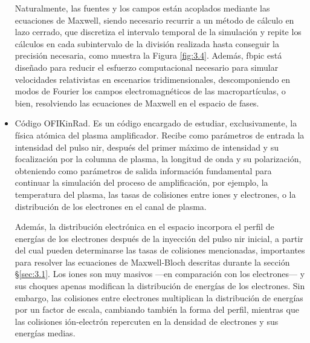 \begin{itemize}
      Naturalmente, las fuentes y los campos están acoplados mediante las ecuaciones de Maxwell, siendo necesario recurrir a un método de cálculo en lazo cerrado, que discretiza el intervalo temporal de la simulación y repite los cálculos en cada subintervalo de la división realizada hasta conseguir la precisión necesaria, como muestra la Figura \ref{fig:3.4}. Además, \acrshort{fbpic} está diseñado para reducir el esfuerzo computacional necesario para simular velocidades relativistas en escenarios tridimensionales, descomponiendo en modos de Fourier los campos electromagnéticos de las macropartículas, o bien, resolviendo las ecuaciones de Maxwell en el espacio de fases.

    \item Código OFIKinRad. Es un código encargado de estudiar, exclusivamente, la física atómica del plasma amplificador. Recibe como parámetros de entrada la intensidad del pulso \acrshort{nir}, después del primer máximo de intensidad y su focalización por la columna de plasma, la longitud de onda y su polarización, obteniendo como parámetros de salida información fundamental para continuar la simulación del proceso de amplificación, por ejemplo, la temperatura del plasma, las tasas de colisiones entre iones y electrones, o la distribución de los electrones en el canal de plasma.

      Además, la distribución electrónica en el espacio incorpora el perfil de energías de los electrones después de la inyección del pulso \acrshort{nir} inicial, a partir del cual pueden determinarse las tasas de colisiones mencionadas, importantes para resolver las ecuaciones de Maxwell-Bloch descritas durante la sección \S\ref{sec:3.1}. Los iones  son muy masivos ---en comparación con los electrones--- y sus choques apenas modifican la distribución de energías de los electrones. Sin embargo, las colisiones entre electrones multiplican la distribución de energías por un factor de escala, cambiando también la forma del perfil, mientras que las colisiones ión-electrón repercuten en la densidad de electrones y sus energías medias.


\end{itemize}
